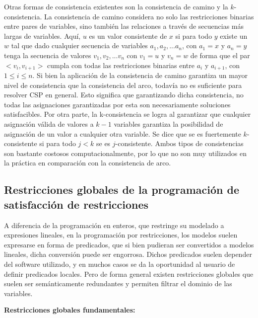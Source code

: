 \documentclass[12pt]{report}
\begin{document}
Otras formas de consistencia existentes son la consistencia de camino y la $k$-consistencia. La consistencia de camino considera no solo las restricciones binarias entre pares de variables, sino también las relaciones a través de secuencias más largas de variables. Aquí, $u$ es un valor consistente de $x$ si para todo $y$ existe un $w$ tal que dado cualquier secuencia de variables $a_1, a_2, ... a_n$, con $a_1=x$ y $a_n=y$ tenga la secuencia de valores $v_1, v_2, ... v_n$ con $v_1=u$ y $v_n=w$ de forma que el par $<v_i,v_{i+1}>$ cumpla con todas las restricciones binarias entre $a_i$ y $a_{i+1}$, con $1\leq  i \leq  n$. Si bien la aplicación de la consistencia de camino garantiza un mayor nivel de consistencia que la consistencia del arco, todavía no es suficiente para resolver CSP en general. Esto significa que garantizando dicha consistencia, no todas las asignaciones garantizadas por esta son necesariamente soluciones satisfacibles. Por otra parte, la k-consistencia se logra al garantizar que cualquier asignación válida de valores a $k-1$ variables garantiza la posibilidad de asignación de un valor a cualquier otra variable. Se dice que se es fuertemente $k$-consistente si para todo $j<k$ se es $j$-consistente. Ambos tipos de consistencias son bastante costosos computacionalmente, por lo que no son muy utilizados en la práctica en comparación con la consistencia de arco.\\

\subsection{Restricciones globales de la programación de satisfacción de restricciones}

A diferencia de la programación en enteros, que restringe su modelado a expresiones lineales, en la programación por restricciones, los modelos suelen expresarse en forma de predicados, que si bien pudieran ser convertidos a modelos lineales, dicha conversión puede ser engorrosa. Dichos predicados suelen depender del software utilizado, y en muchos casos se da la oportunidad al usuario de definir predicados locales. Pero de forma general existen restricciones globales que suelen ser semánticamente redundantes y permiten filtrar el dominio de las variables.


\textbf{Restricciones globales fundamentales:}\\
\end{document}
